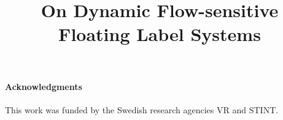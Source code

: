 \documentclass[10pt, conference, compsocconf, letterpaper]{IEEEtran}
\newif\ifextended
\begin{document}
\title{On Dynamic Flow-sensitive Floating Label Systems}
\ifextended
\subtitle{Extended Version}

\fi

\author{
\and
{}
\and
{}
\and
{}
}


\maketitle












{\small
\paragraph{Acknowledgments}
This work was funded by the Swedish research agencies VR and STINT. 
}

{\frenchspacing

}
\end{document}
